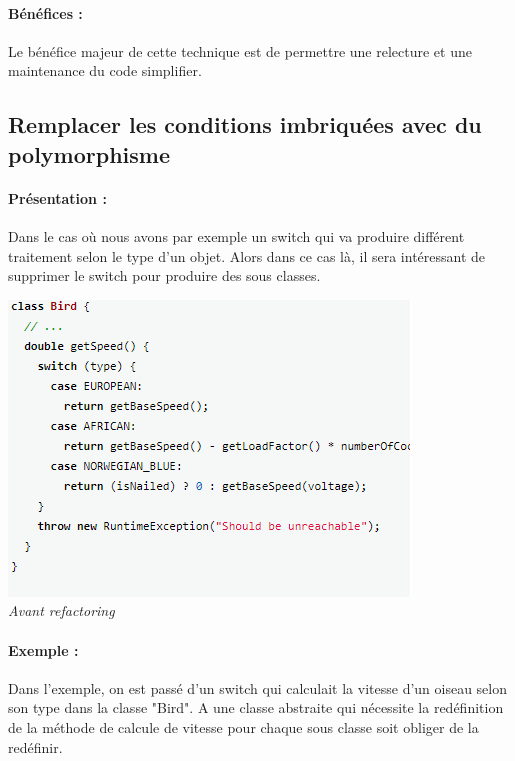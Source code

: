 \documentclass[a4paper,twoside,12pt,openright]{report}
\begin{document}
\paragraph{Bénéfices :}
Le bénéfice majeur de cette technique est de permettre une relecture et une maintenance du code simplifier.

\subsection{Remplacer les conditions imbriquées avec du polymorphisme}
\paragraph{Présentation :}
Dans le cas où nous avons par exemple un switch qui va produire différent traitement selon le type d'un objet. Alors dans ce cas là, il sera intéressant de supprimer le switch pour produire des sous classes.

\begin{center}
\includegraphics[scale=1]{Image/ReplaceConditionalPoly.png}\\
\itshape{Avant refactoring \cite{ref5}}
\end{center}

\paragraph{Exemple :}
Dans l'exemple, on est passé d'un switch qui calculait la vitesse d'un oiseau selon son type dans la classe "Bird". A une classe abstraite qui nécessite la redéfinition de la méthode de calcule de vitesse pour chaque sous classe soit obliger de la redéfinir.
\end{document}

